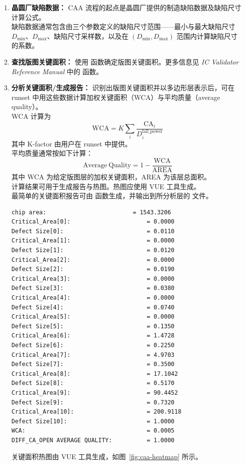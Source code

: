 \begin{enumerate}
  \item \textbf{晶圆厂缺陷数据：} CAA 流程的起点是晶圆厂提供的制造缺陷数据及缺陷尺寸计算公式。\\
  缺陷数据通常包含由三个参数定义的缺陷尺寸范围——最小与最大缺陷尺寸 $D_{\mathrm{min}}$、$D_{\mathrm{max}}$、缺陷尺寸采样数，以及在 $(D_{\mathrm{min}}, D_{\mathrm{max}})$ 范围内计算缺陷尺寸的系数。

  \item \textbf{查找版图关键面积：} 使用  函数确定版图关键面积。更多信息见 \textit{IC Validator Reference Manual} 中的  函数。

  \item \textbf{分析关键面积/生成报告：} 识别出版图关键面积并以多边形层表示后，可在 runset 中用这些数据计算加权关键面积（WCA）与平均质量（average quality）。\\
  WCA 计算为
  \[
    \mathrm{WCA} = K \sum_{i} \frac{\mathrm{CA}_{i}}{D_{i}^{\mathrm{fall\_power}}}
  \]
  其中 K-factor 由用户在 runset 中提供。\\
  平均质量通常按如下计算：
  \[
    \mathrm{Average\ Quality} = 1 - \frac{\mathrm{WCA}}{\mathrm{AREA}}
  \]
  其中 WCA 为给定版图层的加权关键面积，AREA 为该层总面积。\\
  计算结果可用于生成报告与热图。热图应使用 VUE 工具生成。\\
  最简单的关键面积报告可由  函数生成，并输出到所分析层的  文件。
\begin{lstlisting}[style=shell]
chip area:                         = 1543.3206
Critical_Area[0]:                      = 0.0000
Defect Size[0]:                        = 0.0110
Critical_Area[1]:                      = 0.0000
Defect Size[1]:                        = 0.0120
Critical_Area[2]:                      = 0.0000
Defect Size[2]:                        = 0.0190
Critical_Area[3]:                      = 0.0000
Defect Size[3]:                        = 0.0380
Critical_Area[4]:                      = 0.0000
Defect Size[4]:                        = 0.0740
Critical_Area[5]:                      = 0.0000
Defect Size[5]:                        = 0.1350
Critical_Area[6]:                      = 1.4728
Defect Size[6]:                        = 0.2250
Critical_Area[7]:                      = 4.9703
Defect Size[7]:                        = 0.3500
Critical_Area[8]:                      = 17.1042
Defect Size[8]:                        = 0.5170
Critical_Area[9]:                      = 90.4452
Defect Size[9]:                        = 0.7320
Critical_Area[10]:                     = 200.9118
Defect Size[10]:                       = 1.0000
WCA:                                   = 0.0005
DIFF_CA_OPEN AVERAGE QUALITY:          = 1.0000
\end{lstlisting}
  关键面积热图由 VUE 工具生成，如图~\ref{fig:caa-heatmap} 所示。
\end{enumerate}

